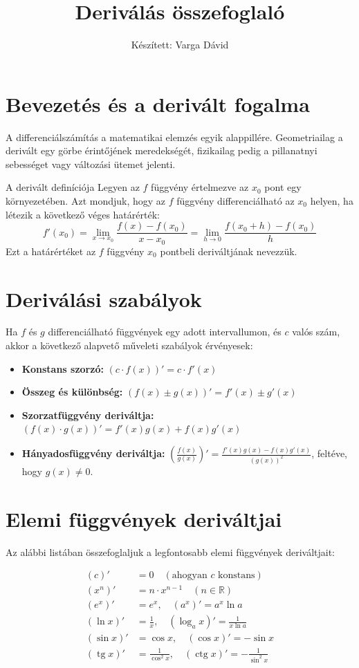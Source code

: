 \documentclass[11pt,a4paper]{article}
\title{Deriválás összefoglaló}
\author{Készített: Varga Dávid}
\date{}
\begin{document}
\maketitle

\section{Bevezetés és a derivált fogalma}
A differenciálszámítás a matematikai elemzés egyik alappillére. Geometriailag a derivált egy görbe érintőjének meredekségét, fizikailag pedig a pillanatnyi sebességet vagy változási ütemet jelenti.

\begin{defbox}{A derivált definíciója}
Legyen az $f$ függvény értelmezve az $x_0$ pont egy környezetében. Azt mondjuk, hogy az $f$ függvény differenciálható az $x_0$ helyen, ha létezik a következő véges határérték:
\[
f'(x_0) = \lim_{x \to x_0} \frac{f(x) - f(x_0)}{x - x_0} = \lim_{h \to 0} \frac{f(x_0 + h) - f(x_0)}{h}
\]
Ezt a határértéket az $f$ függvény $x_0$ pontbeli deriváltjának nevezzük.
\end{defbox}

\section{Deriválási szabályok}
Ha $f$ és $g$ differenciálható függvények egy adott intervallumon, és $c$ valós szám, akkor a következő alapvető műveleti szabályok érvényesek:

\begin{itemize}
    \item \textbf{Konstans szorzó:} $(c \cdot f(x))' = c \cdot f'(x)$
    \item \textbf{Összeg és különbség:} $(f(x) \pm g(x))' = f'(x) \pm g'(x)$
    \item \textbf{Szorzatfüggvény deriváltja:} $(f(x) \cdot g(x))' = f'(x)g(x) + f(x)g'(x)$
    \item \textbf{Hányadosfüggvény deriváltja:} $\left(\frac{f(x)}{g(x)}\right)' = \frac{f'(x)g(x) - f(x)g'(x)}{(g(x))^2}$, feltéve, hogy $g(x) \neq 0$.
\end{itemize}

\section{Elemi függvények deriváltjai}
Az alábbi listában összefoglaljuk a legfontosabb elemi függvények deriváltjait:

\begin{align*}
    (c)' &= 0 \quad (\text{ahogyan } c \text{ konstans}) \\
    (x^n)' &= n \cdot x^{n-1} \quad (n \in \mathbb{R}) \\
    (e^x)' &= e^x, \quad (a^x)' = a^x \ln a \\
    (\ln x)' &= \frac{1}{x}, \quad (\log_a x)' = \frac{1}{x \ln a} \\
    (\sin x)' &= \cos x, \quad (\cos x)' = -\sin x \\
    (\operatorname{tg} x)' &= \frac{1}{\cos^2 x}, \quad (\operatorname{ctg} x)' = -\frac{1}{\sin^2 x}
\end{align*}
\end{document}
